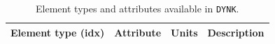 \begin{table}[ht]
\begin{center}
\caption{Element types and attributes available in \texttt{DYNK}.}
\label{tab:DYNK_SET} %
\begin{tabular}{|l | l | l | p{6cm}|}

  \hline
  \rowcolor{blue!30}
  Element type (idx) & Attribute & Units & Description \\
  \hline


  


\end{tabular}
\end{center}
\end{table}
